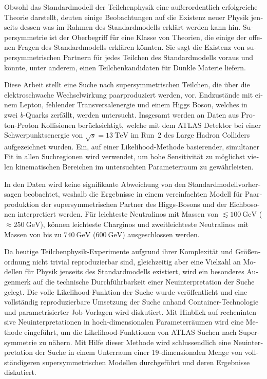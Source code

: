 
\begin{otherlanguage}{ngerman} 
\begin{zusammenfassung}

Obwohl das Standardmodell der Teilchenphysik eine außerordentlich erfolgreiche Theorie darstellt, deuten einige Beobachtungen auf die Existenz neuer Physik jenseits dessen was im Rahmen des Standardmodells erklärt werden kann hin.
Supersymmetrie ist der Oberbegriff für eine Klasse von Theorien, die einige der offenen Fragen des Standardmodells erklären könnten.
Sie sagt die Existenz von supersymmetrischen Partnern für jedes Teilchen des Standardmodells voraus und könnte, unter anderem, einen Teilchenkandidaten für Dunkle Materie liefern. 

Diese Arbeit stellt eine Suche nach supersymmetrischen Teilchen, die über die elektroschwache Wechsel\-wirkung paarproduziert werden, vor.
Endzustände mit einem Lepton, fehlender Transversal\-energie und einem Higgs Boson, welches in zwei \textit{b}-Quarks zerfällt, werden untersucht.
Insgesamt werden \onethirtynineifb an Daten aus Proton-Proton Kollisionen berücksichtigt, welche mit dem ATLAS Detektor bei einer Schwerpunktsenergie von $\sqrt{s}=\SI{13}{\TeV}$ im Run~2 des Large Hadron Colliders aufgezeichnet wurden.
Ein, auf einer Likelihood-Methode basierender, simultaner Fit in allen Suchregionen wird verwendet, um hohe Sensitivität zu möglichst vielen kinematischen Bereichen im untersuchten Parameterraum zu gewährleisten.

In den Daten wird keine signifikante Abweichung von den Standardmodellvorhersagen beobachtet, weshalb die Ergebnisse in einem vereinfachten Modell für Paarproduktion der supersymmetrischen Partner des Higgs-Bosons und der Eichbosonen interpretiert werden.
Für leichteste Neutralinos mit Massen von $\lesssim \SI{100}{\GeV}$ ($\approx\SI{250}{\GeV}$), können leichteste Charginos und zweitleichteste Neutralinos mit Massen von bis zu $\SI{740}{\GeV}$ ($\SI{600}{\GeV}$) ausgeschlossen werden.

Da heutige Teilchenphysik-Experimente aufgrund ihrer Komplexität und Größenordnung nicht trivial reproduzierbar sind, gleichzeitig aber eine Vielzahl an Modellen für Physik jenseits des Standardmodells existiert, wird ein besonderes Augenmerk auf die technische Durchführbarkeit einer Neuinterpretation der Suche gelegt.
Die volle Likelihood-Funktion der Suche wurde veröffentlicht und eine vollständig reproduzierbare Umsetzung der Suche anhand Container-Technologie und parametrisierter Job-Vorlagen wird diskutiert.
Mit Hinblick auf rechenintensive Neuinterpretationen in hoch-dimensionalen Parameter\-räumen wird eine Methode eingeführt, um die Likelihood-Funktionen von ATLAS Suchen nach Supersymmetrie zu nähern.
Mit Hilfe dieser Methode wird schlussendlich eine Neuinterpretation der Suche in einem Unterraum einer 19-dimensionalen Menge von vollständigeren supersymmetrischen Modellen durchgeführt und deren Ergebnisse diskutiert. 


\end{zusammenfassung}
\end{otherlanguage}
